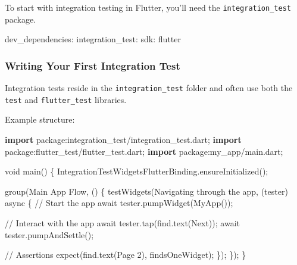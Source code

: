 \documentclass[
]{article}
\newenvironment{Shaded}{\begin{snugshade}}{\end{snugshade}}
\newcommand{\AttributeTok}[1]{\textcolor[rgb]{0.16,0.50,0.73}{#1}}
\newcommand{\CommentTok}[1]{\textcolor[rgb]{0.48,0.49,0.49}{#1}}
\newcommand{\DataTypeTok}[1]{\textcolor[rgb]{0.16,0.50,0.73}{#1}}
\newcommand{\KeywordTok}[1]{\textcolor[rgb]{0.81,0.81,0.76}{\textbf{#1}}}
\newcommand{\NormalTok}[1]{\textcolor[rgb]{0.81,0.81,0.76}{#1}}
\newcommand{\OperatorTok}[1]{\textcolor[rgb]{0.81,0.81,0.76}{#1}}
\newcommand{\StringTok}[1]{\textcolor[rgb]{0.96,0.31,0.31}{#1}}
\begin{document}
To start with integration testing in Flutter, you'll need the
\texttt{integration\_test} package.

\begin{Shaded}
\begin{Highlighting}[]
\NormalTok{dev\_dependencies}\OperatorTok{:}
\NormalTok{  integration\_test}\OperatorTok{:}
\NormalTok{    sdk}\OperatorTok{:}\NormalTok{ flutter}
\end{Highlighting}
\end{Shaded}

\subsubsection{Writing Your First Integration
Test}\label{writing-your-first-integration-test}

Integration tests reside in the \texttt{integration\_test} folder and
often use both the \texttt{test} and \texttt{flutter\_test} libraries.

Example structure:

\begin{Shaded}
\begin{Highlighting}[]
\KeywordTok{import} \StringTok{\textquotesingle{}package:integration\_test/integration\_test.dart\textquotesingle{}}\NormalTok{;}
\KeywordTok{import} \StringTok{\textquotesingle{}package:flutter\_test/flutter\_test.dart\textquotesingle{}}\NormalTok{;}
\KeywordTok{import} \StringTok{\textquotesingle{}package:my\_app/main.dart\textquotesingle{}}\NormalTok{;}

\DataTypeTok{void}\NormalTok{ main() }\OperatorTok{\{}
\NormalTok{  IntegrationTestWidgetsFlutterBinding}\OperatorTok{.}\NormalTok{ensureInitialized();}

\NormalTok{  group(}\StringTok{\textquotesingle{}Main App Flow\textquotesingle{}}\OperatorTok{,}\NormalTok{ () }\OperatorTok{\{}
\NormalTok{    testWidgets(}\StringTok{\textquotesingle{}Navigating through the app\textquotesingle{}}\OperatorTok{,}\NormalTok{ (tester) }\AttributeTok{async} \OperatorTok{\{}
      \CommentTok{// Start the app}
      \AttributeTok{await}\NormalTok{ tester}\OperatorTok{.}\NormalTok{pumpWidget(MyApp());}

      \CommentTok{// Interact with the app}
      \AttributeTok{await}\NormalTok{ tester}\OperatorTok{.}\NormalTok{tap(find}\OperatorTok{.}\NormalTok{text(}\StringTok{\textquotesingle{}Next\textquotesingle{}}\NormalTok{));}
      \AttributeTok{await}\NormalTok{ tester}\OperatorTok{.}\NormalTok{pumpAndSettle();}

      \CommentTok{// Assertions}
\NormalTok{      expect(find}\OperatorTok{.}\NormalTok{text(}\StringTok{\textquotesingle{}Page 2\textquotesingle{}}\NormalTok{)}\OperatorTok{,}\NormalTok{ findsOneWidget);}
    \OperatorTok{\}}\NormalTok{);}
  \OperatorTok{\}}\NormalTok{);}
\OperatorTok{\}}
\end{Highlighting}
\end{Shaded}
\end{document}
